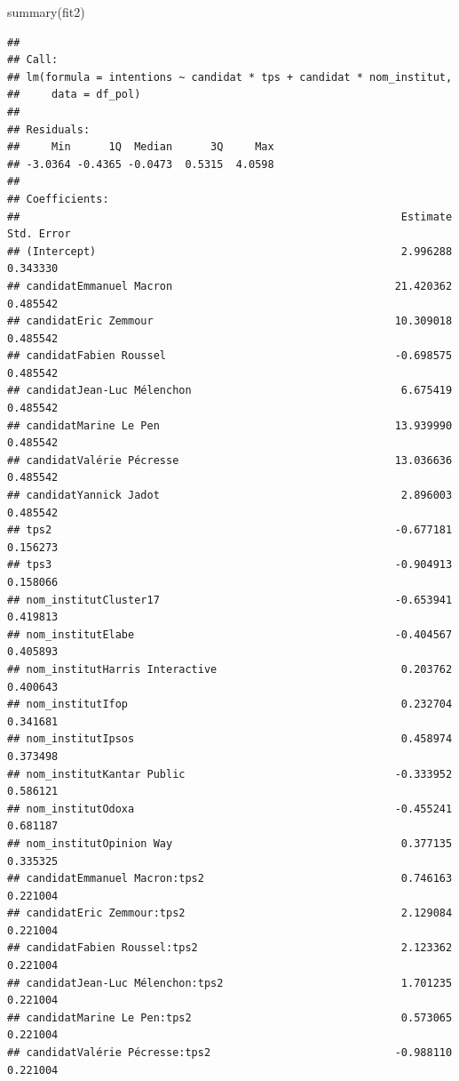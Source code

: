 \documentclass[
]{book}
\newenvironment{Shaded}{\begin{snugshade}}{\end{snugshade}}
\newcommand{\FunctionTok}[1]{\textcolor[rgb]{0.00,0.00,0.00}{#1}}
\newcommand{\NormalTok}[1]{#1}
\begin{document}
\begin{Shaded}
\begin{Highlighting}[]
\FunctionTok{summary}\NormalTok{(fit2)}
\end{Highlighting}
\end{Shaded}

\begin{verbatim}
## 
## Call:
## lm(formula = intentions ~ candidat * tps + candidat * nom_institut, 
##     data = df_pol)
## 
## Residuals:
##     Min      1Q  Median      3Q     Max 
## -3.0364 -0.4365 -0.0473  0.5315  4.0598 
## 
## Coefficients:
##                                                            Estimate Std. Error
## (Intercept)                                                2.996288   0.343330
## candidatEmmanuel Macron                                   21.420362   0.485542
## candidatEric Zemmour                                      10.309018   0.485542
## candidatFabien Roussel                                    -0.698575   0.485542
## candidatJean-Luc Mélenchon                                 6.675419   0.485542
## candidatMarine Le Pen                                     13.939990   0.485542
## candidatValérie Pécresse                                  13.036636   0.485542
## candidatYannick Jadot                                      2.896003   0.485542
## tps2                                                      -0.677181   0.156273
## tps3                                                      -0.904913   0.158066
## nom_institutCluster17                                     -0.653941   0.419813
## nom_institutElabe                                         -0.404567   0.405893
## nom_institutHarris Interactive                             0.203762   0.400643
## nom_institutIfop                                           0.232704   0.341681
## nom_institutIpsos                                          0.458974   0.373498
## nom_institutKantar Public                                 -0.333952   0.586121
## nom_institutOdoxa                                         -0.455241   0.681187
## nom_institutOpinion Way                                    0.377135   0.335325
## candidatEmmanuel Macron:tps2                               0.746163   0.221004
## candidatEric Zemmour:tps2                                  2.129084   0.221004
## candidatFabien Roussel:tps2                                2.123362   0.221004
## candidatJean-Luc Mélenchon:tps2                            1.701235   0.221004
## candidatMarine Le Pen:tps2                                 0.573065   0.221004
## candidatValérie Pécresse:tps2                             -0.988110   0.221004

\end{verbatim}
\end{document}
